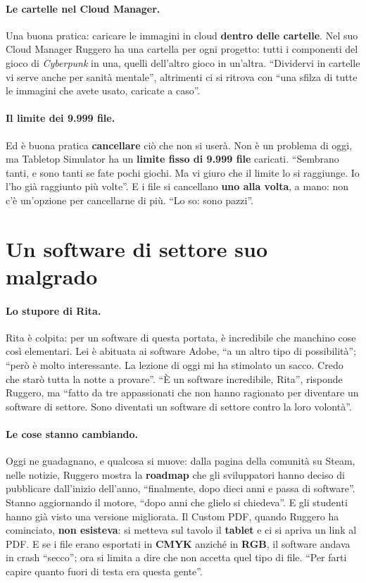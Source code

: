 \paragraph{Le cartelle nel Cloud Manager.} Una buona pratica: caricare le immagini in
cloud \textbf{dentro delle cartelle}. Nel suo Cloud Manager Ruggero ha una cartella per
ogni progetto: tutti i componenti del gioco di \emph{Cyberpunk} in una, quelli
dell'altro gioco in un'altra. ``Dividervi in cartelle vi serve anche per sanità
mentale'', altrimenti ci si ritrova con ``una sfilza di tutte le immagini che avete
usato, caricate a caso''.

\paragraph{Il limite dei 9.999 file.} Ed è buona pratica \textbf{cancellare} ciò che
non si userà. Non è un problema di oggi, ma Tabletop Simulator ha un \textbf{limite
fisso di 9.999 file} caricati. ``Sembrano tanti, e sono tanti se fate pochi giochi. Ma
vi giuro che il limite lo si raggiunge. Io l'ho già raggiunto più volte''. E i file si
cancellano \textbf{uno alla volta}, a mano: non c'è un'opzione per cancellarne di più.
``Lo so: sono pazzi''.

\section{Un software di settore suo malgrado}
\label{a8:sec:storia}

\paragraph{Lo stupore di Rita.} Rita è colpita: per un software di questa portata, è
incredibile che manchino cose così elementari. Lei è abituata ai software Adobe, ``a un
altro tipo di possibilità''; ``però è molto interessante. La lezione di oggi mi ha
stimolato un sacco. Credo che starò tutta la notte a provare''. ``È un software
incredibile, Rita'', risponde Ruggero, ma ``fatto da tre appassionati che non hanno
ragionato per diventare un software di settore. Sono diventati un software di settore
contro la loro volontà''.

\paragraph{Le cose stanno cambiando.} Oggi ne guadagnano, e qualcosa si muove: dalla
pagina della comunità su Steam, nelle notizie, Ruggero mostra la \textbf{roadmap} che gli
sviluppatori hanno deciso di pubblicare dall'inizio dell'anno, ``finalmente, dopo dieci
anni e passa di software''. Stanno aggiornando il motore, ``dopo anni che glielo si
chiedeva''. E gli studenti hanno già visto una versione migliorata. Il Custom PDF,
quando Ruggero ha cominciato, \textbf{non esisteva}: si metteva sul tavolo il
\textbf{tablet} e ci si apriva un link al PDF. E se i file erano esportati in
\textbf{CMYK} anziché in \textbf{RGB}, il software andava in crash ``secco''; ora si
limita a dire che non accetta quel tipo di file. ``Per farti capire quanto fuori di
testa era questa gente''.

